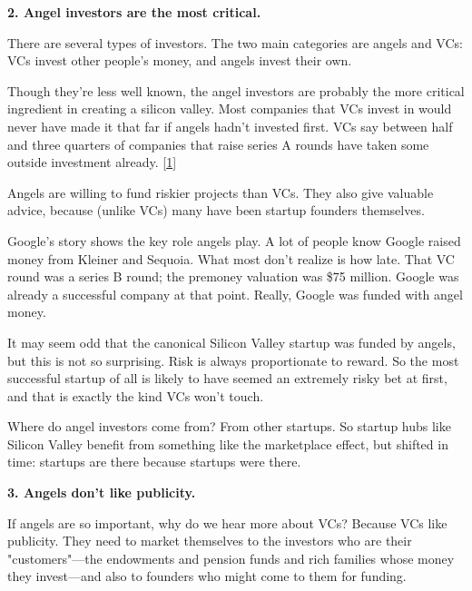 \textbf{2. Angel investors are the most critical.}

There are several types of investors. The two
                  main categories are angels and VCs: VCs invest other people's
                  money, and angels invest their own.

Though they're
                  less well known, the angel investors are probably the more
                  critical ingredient in creating a silicon valley. Most
                  companies that VCs invest in would never have made it that far
                  if angels hadn't invested first. VCs say between half and
                  three quarters of companies that raise series A rounds have
                  taken some outside investment already.
                  [\href{\#f1n}{1}]

Angels are willing to fund riskier projects than
                  VCs. They also give valuable advice, because (unlike VCs) many
                  have been startup founders themselves.

Google's
                  story shows the key role angels play. A lot of people know
                  Google raised money from Kleiner and Sequoia. What most don't
                  realize is how late. That VC round was a series B round; the
                  premoney valuation was \$75 million. Google was already a
                  successful company at that point. Really, Google was funded
                  with angel money.

It may seem odd that the
                  canonical Silicon Valley startup was funded by angels, but
                  this is not so surprising. Risk is always proportionate to
                  reward. So the most successful startup of all is likely to
                  have seemed an extremely risky bet at first, and that is
                  exactly the kind VCs won't touch.

Where do angel
                  investors come from? From other startups. So startup hubs like
                  Silicon Valley benefit from something like the marketplace
                  effect, but shifted in time: startups are there because
                  startups were there.

\textbf{3. Angels don't like publicity.}

If angels are so important, why do we hear more
                  about VCs? Because VCs like publicity. They need to market
                  themselves to the investors who are their
                  "customers"---the endowments and pension funds and rich
                  families whose money they invest---and also to founders
                  who might come to them for funding.

